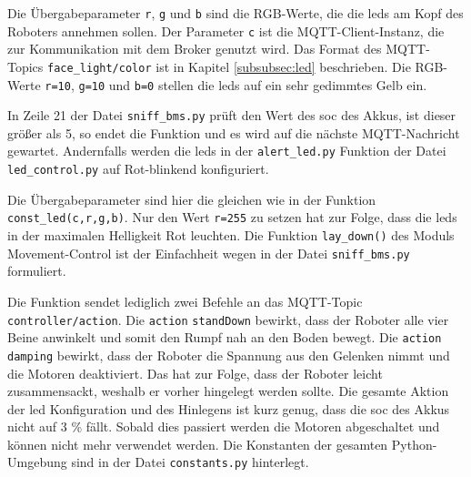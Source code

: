 

\noindent Die Übergabeparameter \texttt{r}, \texttt{g} und \texttt{b} sind die RGB-Werte, die die \glspl{led} am Kopf des
Roboters annehmen sollen.
Der Parameter \texttt{c} ist die MQTT-Client-Instanz, die zur Kommunikation mit dem Broker genutzt wird.
Das Format des MQTT-Topics \texttt{face\_light/color} ist in Kapitel \ref{subsubsec:led} beschrieben.
Die RGB-Werte \texttt{r=10}, \texttt{g=10} und \texttt{b=0} stellen die \glspl{led} auf ein sehr gedimmtes Gelb ein.

In Zeile \num{21} der Datei \texttt{sniff\_bms.py} prüft den Wert des \gls{soc} des Akkus, ist dieser größer als \num{5},
so endet die Funktion und es wird auf die nächste MQTT-Nachricht gewartet.
Andernfalls werden die \glspl{led} in der \texttt{alert\_led.py} Funktion der Datei \texttt{led\_control.py}
auf Rot-blinkend konfiguriert.



\noindent Die Übergabeparameter sind hier die gleichen wie in der Funktion \texttt{const\_led(c,r,g,b)}.
Nur den Wert \texttt{r=255} zu setzen hat zur Folge, dass die \glspl{led} in der maximalen Helligkeit Rot leuchten.
Die Funktion \texttt{lay\_down()} des Moduls Movement-Control ist der Einfachheit wegen in der Datei \texttt{sniff\_bms.py}
formuliert.



\noindent Die Funktion sendet lediglich zwei Befehle an das MQTT-Topic \texttt{controller/action}.
Die \texttt{action} \texttt{standDown} bewirkt, dass der Roboter alle vier Beine anwinkelt und somit den Rumpf nah an
den Boden bewegt.
Die \texttt{action} \texttt{damping} bewirkt, dass der Roboter die Spannung aus den Gelenken nimmt und die Motoren deaktiviert.
Das hat zur Folge, dass der Roboter leicht zusammensackt, weshalb er vorher hingelegt werden sollte.
Die gesamte Aktion der \gls{led} Konfiguration und des Hinlegens ist kurz genug, dass die \gls{soc} des Akkus nicht auf
\num{3} \% fällt.
Sobald dies passiert werden die Motoren abgeschaltet und können nicht mehr verwendet werden.
Die Konstanten der gesamten Python-Umgebung sind in der Datei \texttt{constants.py} hinterlegt.

